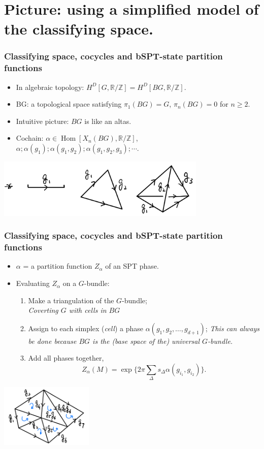 \documentclass[xcolor=table, aspectratio=169]{beamer}
\newcommand{\uone}{\mathbb R/\mathbb Z}
\DeclareMathOperator{\hhom}{Hom}
\begin{document}
\section{Picture: using a simplified model of the classifying space.}

\begin{frame}
	\frametitle{Classifying space, cocycles and bSPT-state partition functions}
	\begin{itemize}
		\item In algebraic topology:
		$H^D[G, \uone] = H^D[BG, \uone]$.
		\item BG: a topological space satisfying $\pi_1(BG)=G$, $\pi_n(BG)=0$ for $n\geq 2$.
		\item Intuitive picture: $BG$ is like an altas.
		\item Cochain: $\alpha\in \hhom[X_n(BG), \uone]$, $\alpha; \alpha(g_1);\alpha(g_1,g_2);\alpha(g_1,g_2,g_3);\cdots$.
	\end{itemize}
	\begin{center}
		\includegraphics[width=10cm]{bg-std}
	\end{center}
\end{frame}

\begin{frame}
	\frametitle{Classifying space, cocycles and bSPT-state partition functions}
	\begin{itemize}
		\item
		$\alpha$ = a partition function $Z_\alpha$ of an SPT phase.
		\item Evaluating $Z_\alpha$ on a $G$-bundle:
		\begin{enumerate}
			\item Make a triangulation of the $G$-bundle;\\
			\emph{Coverting $G$ with cells in $BG$}
			\item Assign to each simplex (\emph{cell}) a phase
			$\alpha(g_1,g_2,\ldots,g_{d+1})$;
			 \emph{This can always be done because $BG$ is the (base space of the) universal $G$-bundle.}
			\item Add all phases together,
			\[Z_\alpha(M) = \exp\{2\pi \sum_{\Delta}s_\Delta\alpha(g_{i_1},g_{i_2})\}.\]
		\end{enumerate}
	\end{itemize}
	\begin{center}
		\includegraphics[height=3cm]{tri-orient}
	\end{center}
\end{frame}
\end{document}
